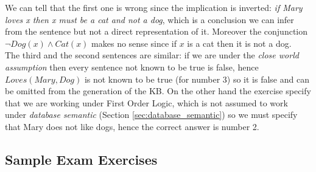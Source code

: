 \documentclass[10pt,a4paper]{article}
\begin{document}
\begin{itemize}
We can tell that the first one is wrong since the implication is inverted: \textit{if Mary loves x then x must be a cat and not a dog}, which is a conclusion we can infer from the sentence but not a direct representation of it. Moreover the conjunction $\neg Dog(x)\wedge Cat(x)$ makes no sense since if $x$ is a cat then it is not a dog.\\

The third and the second sentences are similar: if we are under the \textit{close world assumption} then every sentence not known to be true is false, hence $Loves(Mary,Dog)$ is not known to be true (for number 3) so it is false and can be omitted from the generation of the KB. On the other hand the exercise specify that we are working under First Order Logic, which is not assumed to work under \textit{database semantic} (Section \ref{sec:database_semantic}) so we must specify that Mary does not like dogs, hence the correct answer is number 2.


\vfill

\subsection{Sample Exam Exercises}


\end{itemize}
\end{document}
